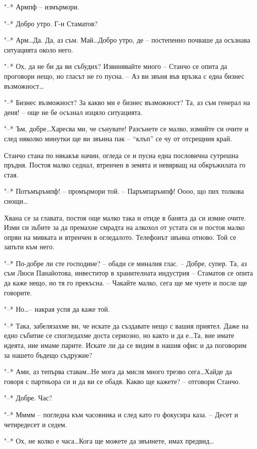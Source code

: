 \documentclass[ebook,openany,12pt]{memoir}
\begin{document}
"--* Армпф – измърмори.

"--* Добро утро. Г-н Стаматов?

"--* Арм\ldots Да. Да, аз съм. Май\ldots Добро утро, де – постепенно почваше да осъзнава ситуацията около него.

"--* Ох, да не би да ви събудих? Извинявайте много – Станчо се опита да проговори нещо, но гласът не го пусна. – Аз ви звъня във връзка с една бизнес възможност\ldots

"--* Бизнес възможност? За какво ми е бизнес възможност? Та, аз съм генерал на деня! – още не бе осъзнал изцяло ситуацията.

"--* Ъм, добре\ldots Харесва ми, че сънувате! Разсънете се малко, измийте си очите и след няколко минутки ще ви звънна пак – ``клъп'' се чу от отсрещния край.

Станчо стана по някакъв начин, огледа се и пусна една пословична сутрешна пръдня. Постоя малко седнал, втренчен в земята и невярващ на обкръжилата го стая.

"--* Потъмъръмпф! – промърмори той. – Паръмпаръмпф! Оооо, що пих толкова снощи\ldots 

Хвана се за главата, постоя още малко така и отиде в банята да си измие очите. Изми си зъбите за да премахне смрадта на алкохол от устата си и постоя малко опрян на мивката и втренчен в огледалото. Телефонът звънна отново. Той се запъти към него.

"--* По-добре ли сте господине? – обади се миналия глас. – Добре, супер. Та, аз съм Люси Панайотова, инвеститор в хранителната индустрия – Стаматов се опита да каже нещо, но тя го прекъсна. – Чакайте малко, сега ще ме чуете и после ще говорите. 

"--* Но\ldots – накрая успя да каже той.

"--* Така, забелязахме ви, че искате да създавате нещо с вашия приятел. Даже на едно събитие се спогледахме доста сериозно, но както и да е\ldots Та, вие имате идеята, ние имаме парите. Искате ли да се видим в нашия офис и да поговорим за нашето бъдещо съдружие?

"--* Ами, аз тепърва ставам\ldots Не мога да мисля много трезво сега\ldots Хайде да говоря с партньора си и да ви се обадя. Какво ще кажете? – отговори Станчо.

"--* Добре. Час?

"--* Мммм – погледна към часовника и след като го фокусира каза. – Десет и четиредесет и седем.

"--* Ох, не колко е часа\ldots Кога ще можете да звъннете, имах предвид\ldots
\end{document}
